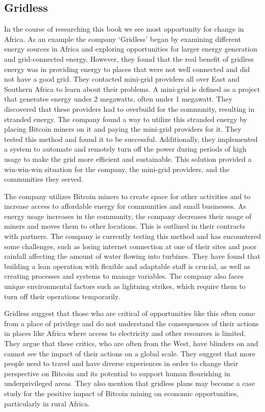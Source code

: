 \subsection{Gridless}
In the course of researching this book we see most opportunity for change in Africa. As an example the company `Gridless' began by examining different energy sources in Africa and exploring opportunities for larger energy generation and grid-connected energy. However, they found that the real benefit of gridless energy was in providing energy to places that were not well connected and did not have a good grid. They contacted mini-grid providers all over East and Southern Africa to learn about their problems. A mini-grid is defined as a project that generates energy under 2 megawatts, often under 1 megawatt. They discovered that these providers had to overbuild for the community, resulting in stranded energy. The company found a way to utilize this stranded energy by placing Bitcoin miners on it and paying the mini-grid providers for it. They tested this method and found it to be successful. Additionally, they implemented a system to automate and remotely turn off the power during periods of high usage to make the grid more efficient and sustainable. This solution provided a win-win-win situation for the company, the mini-grid providers, and the communities they served.\par
The company utilizes Bitcoin miners to create space for other activities and to increase access to affordable energy for communities and small businesses. As energy usage increases in the community, the company decreases their usage of miners and moves them to other locations. This is outlined in their contracts with partners. The company is currently testing this method and has encountered some challenges, such as losing internet connection at one of their sites and poor rainfall affecting the amount of water flowing into turbines. They have found that building a lean operation with flexible and adaptable staff is crucial, as well as creating processes and systems to manage variables. The company also faces unique environmental factors such as lightning strikes, which require them to turn off their operations temporarily.\par
Gridless suggest that those who are critical of opportunities like this often come from a place of privilege and do not understand the consequences of their actions in places like Africa where access to electricity and other resources is limited. They argue that these critics, who are often from the West, have blinders on and cannot see the impact of their actions on a global scale. They suggest that more people need to travel and have diverse experiences in order to change their perspective on Bitcoin and its potential to support human flourishing in underprivileged areas. They also mention that gridless plans may become a case study for the positive impact of Bitcoin mining on economic opportunities, particularly in rural Africa.
